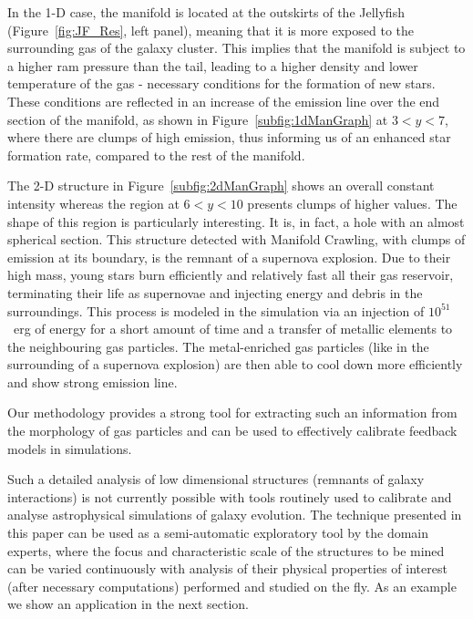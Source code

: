 In the 1-D case, the manifold is located at the outskirts of the Jellyfish (Figure~\ref{fig:JF_Res}, left panel),
meaning that it is more exposed to the surrounding gas of the galaxy cluster.
This implies that the manifold is subject to a higher ram pressure than the tail, leading to a higher density and lower temperature of the gas - necessary conditions for the formation of new stars.
These conditions are reflected in an increase of the \cii{} emission line over the end section of the manifold, as shown in Figure~\ref{subfig:1dManGraph} at $3 < y < 7$, where there are clumps of high \cii{} emission, thus informing us of an enhanced star formation rate, compared to the rest of the manifold.

The 2-D structure in Figure~\ref{subfig:2dManGraph} shows an overall constant \cii{} intensity whereas the region at $6 < y < 10$ presents clumps of higher values.
The shape of this region is particularly interesting.
It is, in fact, a hole with an almost spherical section.
This structure detected with Manifold Crawling, with clumps of \cii{} emission at its boundary, is the remnant of a supernova explosion.
Due to their high mass, young stars burn efficiently and relatively fast all their gas reservoir, terminating their life as supernovae and injecting energy and debris in the surroundings.
This process is modeled in the simulation via an injection of $10^{51}$~erg of energy for a short amount of time and a transfer of metallic elements \citep[in the case of our simulations, the model tracks iron and magnesium,][] {DeRijcke2013} to the neighbouring gas particles.
The metal-enriched gas particles (like in the surrounding of a supernova explosion) are then able to cool down more efficiently and show strong \cii{} emission line.

Our methodology provides a strong tool for extracting such an information from the morphology of gas particles and can be used to effectively calibrate feedback models in simulations.

Such a detailed analysis of low dimensional structures (remnants of galaxy interactions) is not currently possible with tools routinely used to calibrate and analyse astrophysical simulations of galaxy evolution.
The technique presented in this paper can be used as a semi-automatic exploratory tool by the domain experts, where the focus and characteristic scale of the structures to be mined can be varied continuously with analysis of their physical properties of interest (after necessary computations) performed and studied on the fly.
As an example we show an application in the next section.

